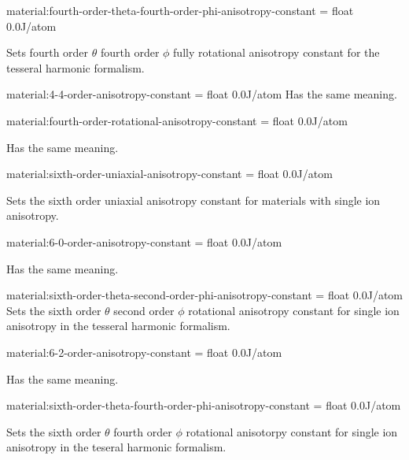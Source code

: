 {\zicf material:fourth-order-theta-fourth-order-phi-anisotropy-constant = float 0.0\newline J/atom} Sets fourth order $\theta$ fourth order $\phi$ fully rotational anisotropy constant for the tesseral harmonic formalism.

{\zicf material:4-4-order-anisotropy-constant = float 0.0\newline J/atom} Has the same meaning.

{\zicf material:fourth-order-rotational-anisotropy-constant = float 0.0\newline J/atom} Has the same meaning.

{\zicf material:sixth-order-uniaxial-anisotropy-constant = float 0.0\newline J/atom} Sets the sixth order uniaxial anisotropy constant for materials with single ion anisotropy.

{\zicf material:6-0-order-anisotropy-constant = float 0.0\newline J/atom} Has the same meaning.

{\zicf material:sixth-order-theta-second-order-phi-anisotropy-constant = float 0.0\newline J/atom} Sets the sixth order $\theta$ second order $\phi$ rotational anisotropy constant for single ion anisotropy in the tesseral harmonic formalism.

{\zicf material:6-2-order-anisotropy-constant = float 0.0\newline J/atom} Has the same meaning.

{\zicf material:sixth-order-theta-fourth-order-phi-anisotropy-constant = float 0.0\newline J/atom} Sets the sixth order $\theta$ fourth order $\phi$ rotational anisotorpy constant for single ion anisotropy in the teseral harmonic formalism.

